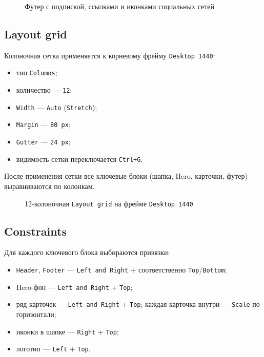\begin{figure}[h]
  \centering
  \caption{Футер с подпиской, ссылками и иконками социальных сетей}
  \label{fig:footer}
\end{figure}

\subsection{Layout grid}

Колоночная сетка применяется к корневому фрейму \texttt{Desktop~1440}:
\begin{itemize}
  \item тип \texttt{Columns};
  \item количество --- \texttt{12};
  \item \texttt{Width} --- \texttt{Auto} (\texttt{Stretch});
  \item \texttt{Margin} --- \texttt{80\,px};
  \item \texttt{Gutter} --- \texttt{24\,px};
  \item видимость сетки переключается \texttt{Ctrl+G}.
\end{itemize}
После применения сетки все ключевые блоки (шапка, Hero, карточки,
футер) выравниваются по колонкам.

\begin{figure}[h]
  \centering
  \caption{12-колоночная \texttt{Layout grid} на фрейме \texttt{Desktop~1440}}
  \label{fig:grid}
\end{figure}

\subsection{Constraints}

Для каждого ключевого блока выбираются привязки:
\begin{itemize}
  \item \texttt{Header}, \texttt{Footer} --- \texttt{Left~and~Right}
        + соответственно \texttt{Top}/\texttt{Bottom};
  \item Hero-фон --- \texttt{Left~and~Right} + \texttt{Top};
  \item ряд карточек --- \texttt{Left~and~Right} + \texttt{Top}; каждая
        карточка внутри --- \texttt{Scale} по горизонтали;
  \item иконки в шапке --- \texttt{Right} + \texttt{Top};
  \item логотип --- \texttt{Left} + \texttt{Top}.
\end{itemize}

